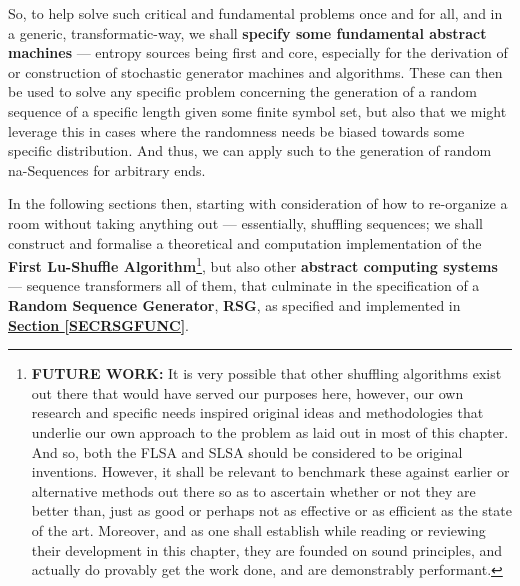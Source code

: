 \documentclass[a4paper, 18pt]{book} %
\begin{document}
So, to help solve such critical and fundamental problems once and for all, and in a generic, transformatic-way, we shall \textbf{specify some fundamental abstract machines} --- entropy sources being first and core, especially for the derivation of or construction of stochastic generator machines and algorithms. These can then be used to solve any specific problem concerning the generation of a random sequence of a specific length given some finite symbol set, but also that we might leverage this in cases where the randomness needs be biased towards some specific distribution. And thus, we can apply such to the generation of random na-Sequences for arbitrary ends.


\vspace{2em}
\vspace{2em}


In the following sections then, starting with consideration of how to re-organize a room without taking anything out --- essentially, shuffling sequences; we shall construct and formalise a theoretical and computation implementation of  the \textbf{First Lu-Shuffle Algorithm}\footnote{\textbf{FUTURE WORK:} It is very possible that other shuffling algorithms exist out there that would have served our purposes here, however, our own research and specific needs inspired original ideas and methodologies that underlie our own approach to the problem as laid out in most of this chapter. And so, both the FLSA and SLSA should be considered to be original inventions. However, it shall be relevant to benchmark these against earlier or alternative methods out there so as to ascertain whether or not they are better than, just as good or perhaps not as effective or as efficient as the state of the art. Moreover, and as one shall establish while reading or reviewing their development in this chapter, they are founded on sound principles, and actually do provably get the work done, and are demonstrably performant.}, but also other \textbf{abstract computing systems} --- sequence transformers all of them, that culminate in the specification of a \textbf{Random Sequence Generator}, \textbf{RSG}, as specified and implemented in \textbf{\hyperref[SECRSGFUNC]{Section \ref{SECRSGFUNC}}}.
\end{document}
